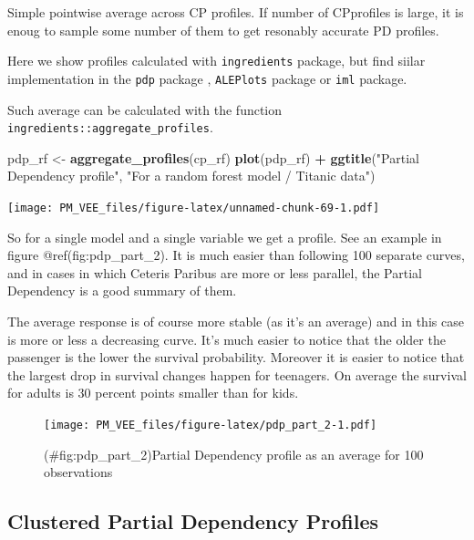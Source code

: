 \documentclass[12pt,]{krantz}
\newenvironment{Shaded}{\begin{snugshade}}{\end{snugshade}}
\newcommand{\KeywordTok}[1]{\textcolor[rgb]{0.13,0.29,0.53}{\textbf{#1}}}
\newcommand{\NormalTok}[1]{#1}
\newcommand{\OperatorTok}[1]{\textcolor[rgb]{0.81,0.36,0.00}{\textbf{#1}}}
\newcommand{\StringTok}[1]{\textcolor[rgb]{0.31,0.60,0.02}{#1}}
\begin{document}
Simple pointwise average across CP profiles. If number of CPprofiles is large, it is enoug to sample some number of them to get resonably accurate PD profiles.

Here we show profiles calculated with \texttt{ingredients} package, but find siilar implementation in the \texttt{pdp} package \citep{pdp}, \texttt{ALEPlots} package \citep{R-ALEPlot} or \texttt{iml} \citep{iml} package.

Such average can be calculated with the function \texttt{ingredients::aggregate\_profiles}.

\begin{Shaded}
\begin{Highlighting}[]
\NormalTok{pdp_rf <-}\StringTok{ }\KeywordTok{aggregate_profiles}\NormalTok{(cp_rf)}
\KeywordTok{plot}\NormalTok{(pdp_rf) }\OperatorTok{+}
\StringTok{  }\KeywordTok{ggtitle}\NormalTok{(}\StringTok{"Partial Dependency profile"}\NormalTok{, }\StringTok{"For a random forest model / Titanic data"}\NormalTok{) }
\end{Highlighting}
\end{Shaded}

\texttt{[image: PM\_VEE\_files/figure-latex/unnamed-chunk-69-1.pdf]}

So for a single model and a single variable we get a profile. See an example in figure @ref(fig:pdp\_part\_2). It is much easier than following 100 separate curves, and in cases in which Ceteris Paribus are more or less parallel, the Partial Dependency is a good summary of them.

The average response is of course more stable (as it's an average) and in this case is more or less a decreasing curve. It's much easier to notice that the older the passenger is the lower the survival probability.
Moreover it is easier to notice that the largest drop in survival changes happen for teenagers. On average the survival for adults is 30 percent points smaller than for kids.

\begin{figure}
\centering
\texttt{[image: PM\_VEE\_files/figure-latex/pdp\_part\_2-1.pdf]}
\caption{(\#fig:pdp\_part\_2)Partial Dependency profile as an average for 100 observations}
\end{figure}

\hypertarget{clustered-partial-dependency-profiles}{%
\subsection{Clustered Partial Dependency Profiles}\label{clustered-partial-dependency-profiles}}
\end{document}
